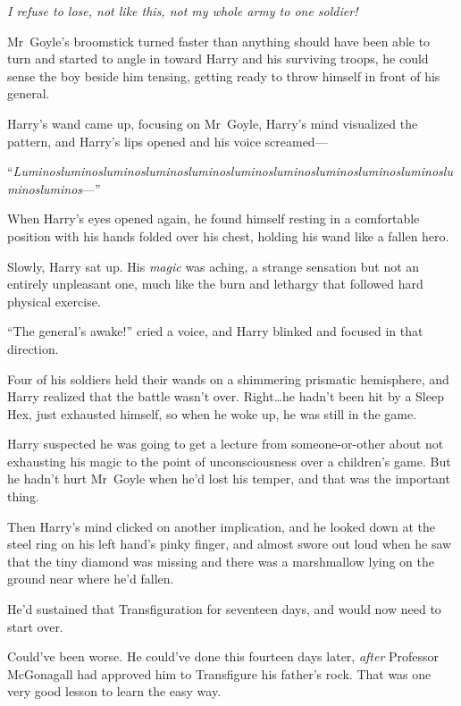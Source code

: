 \emph{I refuse to lose, not like this, not my whole army to one soldier!}

Mr~Goyle’s broomstick turned faster than anything should have been able to turn and started to angle in toward Harry and his surviving troops, he could sense the boy beside him tensing, getting ready to throw himself in front of his general.

\emph{}

Harry’s wand came up, focusing on Mr~Goyle, Harry’s mind visualized the pattern, and Harry’s lips opened and his voice screamed—

“\emph{Lu\-min\-os\-lu\-min\-os\-lu\-min\-os\-lu\-min\-os\-lu\-min\-os\-lu\-min\-os\-lu\-min\-os\-lu\-min\-os\-lu\-min\-os\-lu\-min\-os\-lu\-min\-os\-lu\-min\-os}—”

\later

When Harry’s eyes opened again, he found himself resting in a comfortable position with his hands folded over his chest, holding his wand like a fallen hero.

Slowly, Harry sat up. His \emph{magic} was aching, a strange sensation but not an entirely unpleasant one, much like the burn and lethargy that followed hard physical exercise.

“The general’s awake!” cried a voice, and Harry blinked and focused in that direction.

Four of his soldiers held their wands on a shimmering prismatic hemisphere, and Harry realized that the battle wasn’t over. Right…he hadn’t been hit by a Sleep Hex, just exhausted himself, so when he woke up, he was still in the game.

Harry suspected he was going to get a lecture from someone-or-other about not exhausting his magic to the point of unconsciousness over a children’s game. But he hadn’t hurt Mr~Goyle when he’d lost his temper, and that was the important thing.

Then Harry’s mind clicked on another implication, and he looked down at the steel ring on his left hand’s pinky finger, and almost swore out loud when he saw that the tiny diamond was missing and there was a marshmallow lying on the ground near where he’d fallen.

He’d sustained that Transfiguration for seventeen days, and would now need to start over.

Could’ve been worse. He could’ve done this fourteen days later, \emph{after} Professor McGonagall had approved him to Transfigure his father’s rock. That was one very good lesson to learn the easy way.

